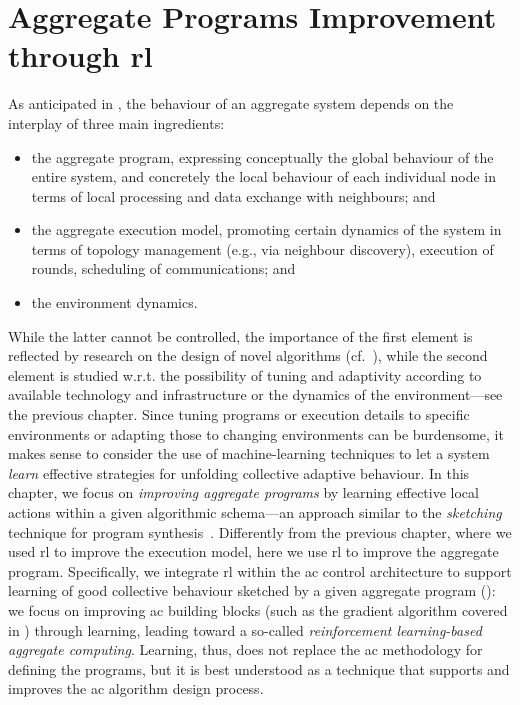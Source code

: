 \section{Aggregate Programs Improvement through \ac{rl}}

As anticipated in , 
 the behaviour of an aggregate system depends on the interplay of three main ingredients:
\begin{itemize}
  \item the aggregate program, expressing conceptually the global behaviour of the entire system, and concretely the local behaviour of each individual node in terms of local processing and data exchange with neighbours; and
  \item the aggregate execution model, promoting certain dynamics of the system in terms of topology management (e.g., via neighbour discovery), execution of rounds, scheduling of communications; and
  \item the environment dynamics.
\end{itemize}
%
While the latter cannot be controlled, 
 the importance of the first element is reflected by research
 on the design of novel algorithms (cf.~\cite{DBLP:journals/jlap/ViroliBDACP19,DBLP:conf/saso/AudritoCDV17}),
 while the second element is studied 
 w.r.t. the possibility of tuning and adaptivity 
 according to 
 available technology and infrastructure 
 or the dynamics of the environment---see the previous chapter. %
%
Since tuning programs or execution details to specific environments
 or adapting those to changing environments
 can be burdensome,
 it makes sense to consider the use of machine-learning techniques
 to let a system \emph{learn} effective strategies for unfolding collective adaptive behaviour.
%
In this chapter, we focus on \emph{improving aggregate programs}
 by learning effective local actions
 within a given algorithmic schema---an approach similar to the \emph{sketching} technique for program synthesis~\cite{solar2008program-synthesis-sketching}.
Differently from the previous chapter, 
 where we used \ac{rl} to improve the execution model, 
 here we use \ac{rl} to improve the aggregate program.
%
Specifically, we integrate \ac{rl} within the \ac{ac} control architecture to support learning of good collective behaviour sketched by a given aggregate program (): 
 we focus on improving \ac{ac} building blocks (such as the gradient algorithm covered in ) through learning, 
 leading toward a so-called \emph{reinforcement learning-based aggregate computing}. 
%
Learning, thus, does not replace the \ac{ac} methodology for defining the programs, 
 but it is best understood as a technique that supports and improves the \ac{ac} algorithm design process.

